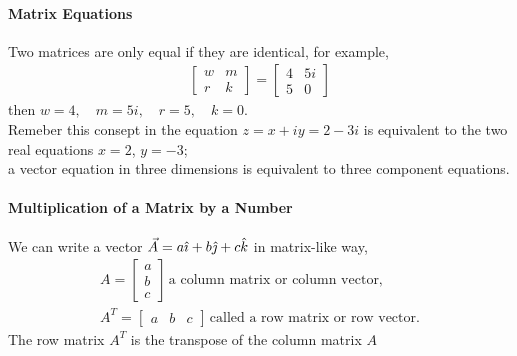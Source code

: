             \paragraph{Matrix Equations} %
            \label{par:Matrix Equations}
            Two matrices are only equal if they are identical, for example,
            \begin{align}
                \begin{bmatrix}
                    w & m \\
                    r & k
                \end{bmatrix} = 
                \begin{bmatrix}
                    4 & 5i \\
                    5 & 0
                \end{bmatrix}
            \end{align}
            then $w=4, \quad m=5i, \quad r=5, \quad k=0$.\\ Remeber this consept in the equation 
            $z = x + iy = 2 - 3i$ is equivalent to the two real equations $x = 2$, $y = -3$; \\
            a vector equation in three dimensions is equivalent to three component equations.
            \paragraph{Multiplication of a Matrix by a Number} %
            \label{par:Multiplication of a Matrix by a Number}
            We can write a vector $\vec{A} = a\hat{\imath}  + b\hat{\jmath}  + c\hat{k} $ in matrix-like way,
            \begin{equation}
                \begin{aligned}
                \label{eq:vector in matrix}
                A = \begin{bmatrix}
                    a\\
                    b\\
                    c
                \end{bmatrix}\, \text{a column matrix or column vector,} \\
                A^T= \begin{bmatrix}
                    a & b & c
                \end{bmatrix}\, \text{called a row matrix or row vector.}
                \end{aligned}
            \end{equation}
            The row matrix $A^T$ is the transpose of the column matrix $A$
            
